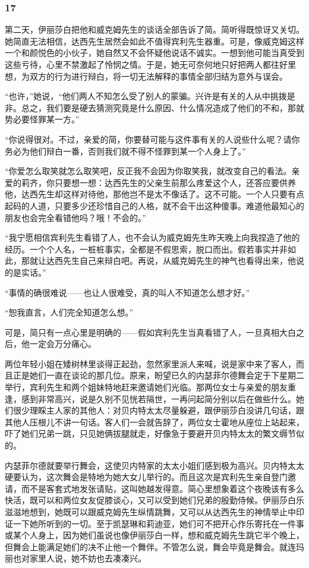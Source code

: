 \subsubsection*{17}

\par 第二天，伊丽莎白把他和威克姆先生的谈话全部告诉了简。简听得既惊讶又关切。她简直无法相信，达西先生居然会如此不值得宾利先生器重。可是，像威克姆这样一个和颜悦色的小伙子，她自然又不会怀疑他说话不诚实。一想到他可能当真受到这些亏待，心里不禁激起了怜悯之情。于是，她无可奈何地只好把两人都往好里想，为双方的行为进行辩白，将一切无法解释的事情全部归结为意外与误会。
\par “也许，”她说，“他们两人不知怎么受了别人的蒙骗。兴许是有关的人从中挑拨是非。总之，我们要是硬去猜测究竟是什么原因、什么情况造成了他们的不和，那就势必要怪罪某一方。”
\par “你说得很对。不过，亲爱的简，你要替可能与这件事有关的人说些什么呢？请你务必为他们辩白一番，否则我们就不得不怪罪到某一个人身上了。”
\par “你爱怎么取笑就怎么取笑吧，反正我不会因为你取笑我，就改变自己的看法。亲爱的莉齐，你只要想一想：达西先生的父亲生前那么疼爱这个人，还答应要供养他，达西先生却这样对待他，那他岂不是太不像话了。这不可能。一个人只要有点起码的人道，只要多少还珍惜自己的人格，就不会干出这种傻事。难道他最知心的朋友也会完全看错他吗？哦！不会的。”
\par “我宁愿相信宾利先生看错了人，也不会认为威克姆先生昨天晚上向我捏造了他的经历。一个个人名，一桩桩事实，全都是不假思索，脱口而出。假若事实并非如此，那就让达西先生自己来辩白吧。再说，从威克姆先生的神气也看得出来，他说的是实话。”
\par “事情的确很难说——也让人很难受，真的叫人不知道怎么想才好。”
\par “恕我直言，人们完全知道怎么想。”
\par 可是，简只有一点心里是明确的——假如宾利先生当真看错了人，一旦真相大白之后，他一定会万分痛心。
\par 两位年轻小姐在矮树林里谈得正起劲，忽然家里派人来喊，说是家中来了客人，而且正是她们一直在谈论的那几位。原来，盼望已久的内瑟菲尔德舞会定于下星期二举行，宾利先生和两个姐妹特地赶来邀请她们光临。那两位女士与亲爱的朋友重逢，感到非常高兴，说是久别不见恍若隔世，一再问起简分别以后在做些什么。她们很少理睬主人家的其他人：对贝内特太太尽量躲避，跟伊丽莎白没讲几句话，跟其他人压根儿不讲一句话。客人们一会就告辞了，两位女士霍地从座位上站起来，吓了她们兄弟一跳，只见她俩拔腿就走，好像急于要避开贝内特太太的繁文缛节似的。
\par 内瑟菲尔德就要举行舞会，这使贝内特家的太太小姐们感到极为高兴。贝内特太太硬要认为，这次舞会是特地为她大女儿举行的。而且这次是宾利先生亲自登门邀请，而不是客套式地发张请贴，这叫她越发得意。简心里想象着这个夜晚该有多么快活，既可以和两位女友促膝谈心，又可以受到她们兄弟的殷勤侍候。伊丽莎白乐滋滋地想到，她既可以跟威克姆先生纵情跳舞，又可以从达西先生的神情举止中印证一下她所听到的一切。至于凯瑟琳和莉迪亚，她们可不把开心作乐寄托在一件事或某个人身上，因为她们虽说也像伊丽莎白一样，想和威克姆先生跳它半个晚上，但舞会上能满足她们的决不止他一个舞伴。不管怎么说，舞会毕竟是舞会。就连玛丽也对家里人说，她不妨也去凑凑兴。
